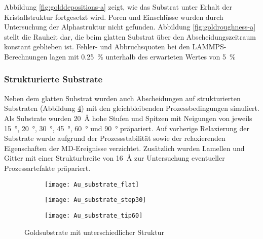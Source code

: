 Abbildung \ref{fig:golddepositions-a} zeigt, wie das Substrat unter Erhalt der Kristallstruktur fortgesetzt wird.
Poren und Einschlüsse wurden durch Untersuchung der Alphastruktur nicht gefunden.
Abbildung \ref{fig:goldroughness-a} stellt die Rauheit dar, die beim glatten Substrat über den Abscheidungszeitraum konstant geblieben ist.
Fehler- und Abbruchsquoten bei den LAMMPS-Berechnungen lagen mit \SI{0.25}{\percent} unterhalb des erwarteten Wertes von \SI{5}{\percent}

\subsubsection{Strukturierte Substrate}

Neben dem glatten Substrat wurden auch Abscheidungen auf strukturierten Substraten (Abbildung \ref{fig:goldsubstrate}) mit den gleichbleibenden Prozessbedingungen simuliert.
Als Substrate wurden \SI{20}{\angstrom} hohe Stufen und Spitzen mit Neigungen von jeweils \SI{15}{\degree}, \SI{20}{\degree}, \SI{30}{\degree}, \SI{45}{\degree}, \SI{60}{\degree} und \SI{90}{\degree} präpariert.
Auf vorherige Relaxierung der Substrate wurde aufgrund der Prozessstabilität sowie der relaxierenden Eigenschaften der MD-Ereignisse verzichtet.
Zusätzlich wurden Lamellen und Gitter mit einer Strukturbreite von \SI{16}{\angstrom} zur Untersuchung eventueller Prozessartefakte präpariert.

\begin{figure}[p]
  \captionsetup[subfigure]{singlelinecheck=false}
  \def\subfigwidth{0.31\textwidth}
  \begin{subfigure}[t]{\subfigwidth}
    \texttt{[image: Au\_substrate\_flat]}
    \label{fig:goldsubstrate-a}
  \end{subfigure}
  \hfill
  \begin{subfigure}[t]{\subfigwidth}
    \texttt{[image: Au\_substrate\_step30]}
    \label{fig:goldsubstrate-b}
  \end{subfigure}
  \hfill
  \begin{subfigure}[t]{\subfigwidth}
    \texttt{[image: Au\_substrate\_tip60]}
    \label{fig:goldsubstrate-c}
  \end{subfigure}
  \caption[Strukturierte Goldsubstrate]{Goldsubstrate mit unterschiedlicher Struktur}
  \label{fig:goldsubstrate}
\end{figure}

